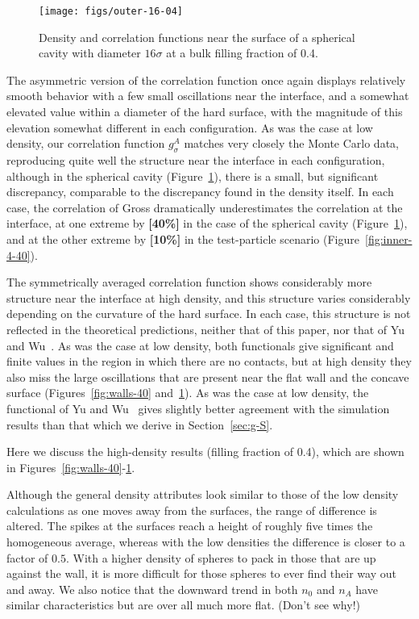 \documentclass[letterpaper,twocolumn,amsmath,amssymb,jcp,10pt,aip]{revtex4-1}
\newcommand{\red}[1]{{\bf \color{red} #1}}
\newcommand{\fixme}[1]{\red{[#1]}}
\begin{document}
\begin{figure}
  \texttt{[image: figs/outer-16-04]}
  \caption{Density and correlation functions near the surface of a
    spherical cavity with diameter $16\sigma$ at a bulk filling
    fraction of 0.4.}
  \label{fig:outer-40}
\end{figure}

The asymmetric version of the correlation function once again displays
relatively smooth behavior with a few small
oscillations near the interface, and a somewhat elevated value within
a diameter of the hard surface, with the magnitude of this elevation
somewhat different in each configuration.  As was the case at low
density, our correlation function $g_\sigma^A$ matches very closely
the Monte Carlo data, reproducing quite well the structure near the
interface in each configuration, although in the spherical cavity
(Figure~\ref{fig:outer-40}), there is a small, but significant
discrepancy, comparable to the discrepancy found in the density
itself.  In each case, the correlation of Gross dramatically
underestimates the correlation at the interface, at one extreme by
\fixme{40\%} in the case of the spherical cavity
(Figure~\ref{fig:outer-40}), and at the other extreme by \fixme{10\%}
in the test-particle scenario (Figure~\ref{fig:inner-4-40}).

The symmetrically averaged correlation function shows considerably
more structure near the interface at high density, and this structure
varies considerably depending on the curvature of the hard surface.
In each case, this structure is not reflected in the theoretical
predictions, neither that of this paper, nor that of Yu and
Wu~\cite{yu2002fmt-dft-inhomogeneous-associating}.  As was the case at
low density, both functionals give significant and finite values in
the region in which there are no contacts, but at high density they
also miss the large oscillations that are present near the flat wall
and the concave surface (Figures~\ref{fig:walls-40}
and~\ref{fig:outer-40}).  As was the case at low density, the
functional of Yu and Wu~\cite{yu2002fmt-dft-inhomogeneous-associating}
gives slightly better agreement with the simulation results than that
which we derive in Section~\ref{sec:g-S}.

Here we discuss the high-density results (filling fraction of 0.4),
which are shown in Figures~\ref{fig:walls-40}-\ref{fig:outer-40}.

Although the general density attributes look similar to those of the low density calculations as one moves away from the surfaces, the range of difference is altered.  The spikes at the surfaces reach a height of roughly five times the homogeneous average, whereas with the low densities the difference is closer to a factor of $0.5$.  With a higher density of spheres to pack in those that are up against the wall, it is more difficult for those spheres to ever find their way out and away.  We also notice that the downward trend in both $n_0$ and $n_A$ have similar characteristics but are over all much more flat.  (Don't see why!)
\end{document}

